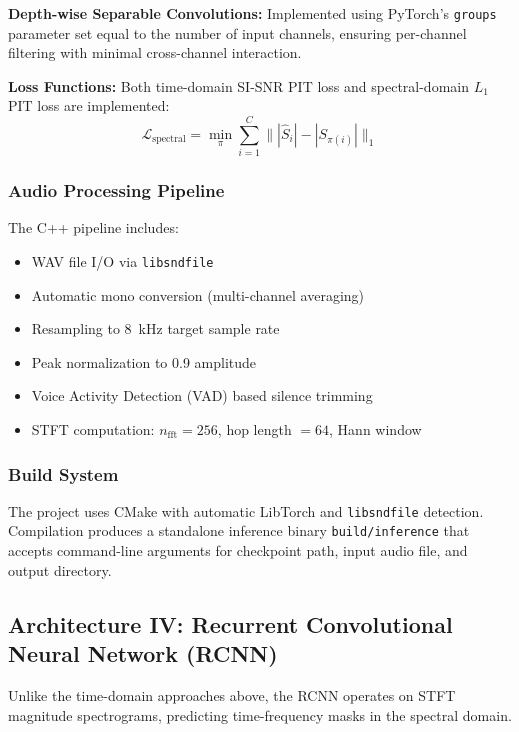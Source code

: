 \documentclass[conference]{IEEEtran}
\begin{document}
\textbf{Depth-wise Separable Convolutions:} Implemented using PyTorch's \texttt{groups} parameter set equal to the number of input channels, ensuring per-channel filtering with minimal cross-channel interaction.

\textbf{Loss Functions:} Both time-domain SI-SNR PIT loss and spectral-domain $L_1$ PIT loss are implemented:
\begin{equation}
\mathcal{L}_{\text{spectral}} = \min_{\pi} \sum_{i=1}^{C} \| |\hat{S}_i| - |S_{\pi(i)}| \|_1
\end{equation}

\subsubsection{Audio Processing Pipeline}

The C++ pipeline includes:
\begin{itemize}[leftmargin=*,nosep]
    \item WAV file I/O via \texttt{libsndfile}
    \item Automatic mono conversion (multi-channel averaging)
    \item Resampling to 8~kHz target sample rate
    \item Peak normalization to 0.9 amplitude
    \item Voice Activity Detection (VAD) based silence trimming
    \item STFT computation: $n_{\text{fft}} = 256$, hop length $= 64$, Hann window
\end{itemize}

\subsubsection{Build System}

The project uses CMake with automatic LibTorch and \texttt{libsndfile} detection. Compilation produces a standalone inference binary \texttt{build/inference} that accepts command-line arguments for checkpoint path, input audio file, and output directory.

\subsection{Architecture IV: Recurrent Convolutional Neural Network (RCNN)}
\label{sec:rcnn}

Unlike the time-domain approaches above, the RCNN operates on STFT magnitude spectrograms, predicting time-frequency masks in the spectral domain.
\end{document}
